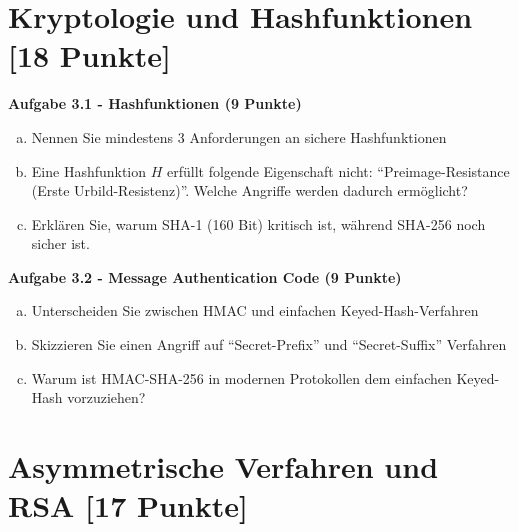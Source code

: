 \documentclass[12pt,a4paper]{article}
\begin{document}
\vspace{5cm}


\newpage

\section{Kryptologie und Hashfunktionen [18 Punkte]}

\textbf{Aufgabe 3.1 - Hashfunktionen (9 Punkte)}

\begin{enumerate}[(a)]
    \item Nennen Sie mindestens 3 Anforderungen an sichere Hashfunktionen
    
    \item Eine Hashfunktion $H$ erfüllt folgende Eigenschaft nicht:
    ``Preimage-Resistance (Erste Urbild-Resistenz)''. Welche Angriffe werden dadurch ermöglicht?
    
    \item Erklären Sie, warum SHA-1 (160 Bit) kritisch ist, während SHA-256 noch sicher ist.
\end{enumerate}

\vspace{3cm}

\textbf{Aufgabe 3.2 - Message Authentication Code (9 Punkte)}

\begin{enumerate}[(a)]
    \item Unterscheiden Sie zwischen HMAC und einfachen Keyed-Hash-Verfahren
    
    \item Skizzieren Sie einen Angriff auf ``Secret-Prefix'' und ``Secret-Suffix'' Verfahren
    
    \item Warum ist HMAC-SHA-256 in modernen Protokollen dem einfachen Keyed-Hash vorzuziehen?
\end{enumerate}

\vspace{3cm}


\newpage

\section{Asymmetrische Verfahren und RSA [17 Punkte]}
\end{document}
